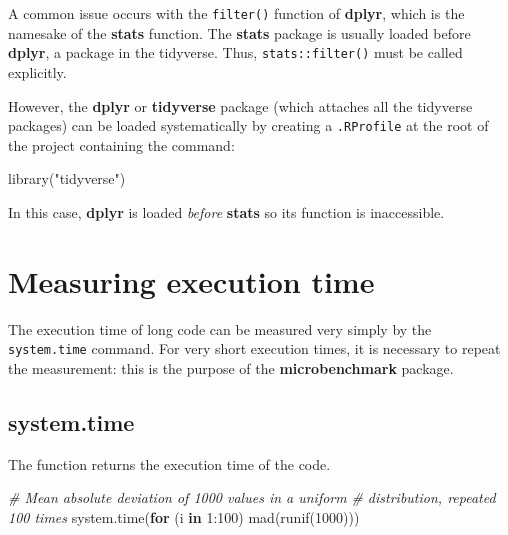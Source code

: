 \documentclass[
  12pt,
  american,
  a4paper,
  extrafontsizes,onecolumn,openright
  ]{memoir}
\newenvironment{Shaded}{\begin{snugshade}}{\end{snugshade}}
\newcommand{\CommentTok}[1]{\textcolor[rgb]{0.56,0.35,0.01}{\textit{#1}}}
\newcommand{\ControlFlowTok}[1]{\textcolor[rgb]{0.13,0.29,0.53}{\textbf{#1}}}
\newcommand{\DecValTok}[1]{\textcolor[rgb]{0.00,0.00,0.81}{#1}}
\newcommand{\FunctionTok}[1]{\textcolor[rgb]{0.00,0.00,0.00}{#1}}
\newcommand{\NormalTok}[1]{#1}
\newcommand{\SpecialCharTok}[1]{\textcolor[rgb]{0.00,0.00,0.00}{#1}}
\newcommand{\StringTok}[1]{\textcolor[rgb]{0.31,0.60,0.02}{#1}}
\begin{document}
A common issue occurs with the \texttt{filter()} function of \textbf{dplyr}, which is the namesake of the \textbf{stats} function.
The \textbf{stats} package is usually loaded before \textbf{dplyr}, a package in the tidyverse.
Thus, \texttt{stats::filter()} must be called explicitly.

However, the \textbf{dplyr} or \textbf{tidyverse} package (which attaches all the tidyverse packages) can be loaded systematically by creating a \texttt{.RProfile} at the root of the project containing the command:

\scriptsize

\begin{Shaded}
\begin{Highlighting}[]
\FunctionTok{library}\NormalTok{(}\StringTok{"tidyverse"}\NormalTok{)}
\end{Highlighting}
\end{Shaded}

\normalsize

In this case, \textbf{dplyr} is loaded \emph{before} \textbf{stats} so its function is inaccessible.

\hypertarget{measuring-execution-time}{%
\section{Measuring execution time}\label{measuring-execution-time}}

The execution time of long code can be measured very simply by the \texttt{system.time} command.
For very short execution times, it is necessary to repeat the measurement: this is the purpose of the \textbf{microbenchmark} package.

\hypertarget{system.time}{%
\subsection{system.time}\label{system.time}}

The function returns the execution time of the code.

\scriptsize

\begin{Shaded}
\begin{Highlighting}[]
\CommentTok{\# Mean absolute deviation of 1000 values in a uniform}
\CommentTok{\# distribution, repeated 100 times}
\FunctionTok{system.time}\NormalTok{(}\ControlFlowTok{for}\NormalTok{ (i }\ControlFlowTok{in} \DecValTok{1}\SpecialCharTok{:}\DecValTok{100}\NormalTok{) }\FunctionTok{mad}\NormalTok{(}\FunctionTok{runif}\NormalTok{(}\DecValTok{1000}\NormalTok{)))}
\end{Highlighting}
\end{Shaded}
\end{document}
